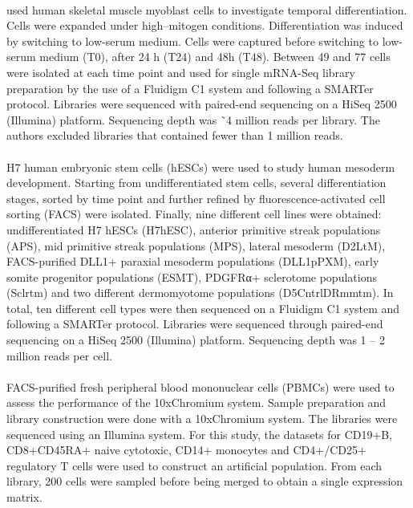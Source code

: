 \documentclass[12pt, a4paper]{article}\usepackage[]{graphicx}\usepackage[]{color}
\begin{document}
\paragraph{\citet{trapnell2014dynamics}} 
\citet{trapnell2014dynamics} used human skeletal muscle myoblast cells to investigate temporal differentiation. Cells were expanded under high--mitogen conditions. Differentiation was induced by switching to low-serum medium. Cells were captured before switching to low-serum medium (T0), after 24 h (T24) and 48h (T48). Between 49 and 77 cells were isolated at each time point and used for single mRNA-Seq library preparation by the use of a Fluidigm C1 system and following a SMARTer protocol. Libraries were sequenced with paired-end sequencing on a HiSeq 2500 (Illumina) platform. Sequencing depth was ˜4 million reads per library. The authors excluded libraries that contained fewer than 1 million reads. 
\paragraph{\citet{koh2016atlas} }
H7 human embryonic stem cells (hESCs) were used to study human mesoderm development. Starting from undifferentiated stem cells, several differentiation stages, sorted by time point and further refined by fluorescence-activated cell sorting (FACS) were isolated. Finally, nine different cell lines were obtained:  undifferentiated H7 hESCs (H7hESC), anterior primitive streak populations (APS), mid primitive streak populations (MPS), lateral mesoderm (D2LtM), FACS-purified DLL1+ paraxial mesoderm populations (DLL1pPXM), early somite progenitor populations (ESMT), PDGFRα+ sclerotome populations (Sclrtm) and two different dermomyotome populations (D5CntrlDRmmtm).
In total, ten different cell types were then sequenced on a Fluidigm C1 system and following a SMARTer protocol. Libraries were sequenced through paired-end sequencing on a HiSeq 2500 (Illumina) platform. Sequencing depth was 1 -- 2 million reads per cell. 
\paragraph{ \citet{zheng2017massively}}
FACS-purified fresh peripheral blood mononuclear cells (PBMCs) were used to assess the performance of the 10xChromium system. Sample preparation and library construction were done with a 10xChromium system. The libraries were sequenced using an Illumina system. For this study, the datasets for CD19+B, CD8+CD45RA+ naive cytotoxic, CD14+ monocytes and CD4+/CD25+ regulatory T cells were used to construct an artificial population. From each library, 200 cells were sampled before being merged to obtain a single expression matrix.
\end{document}

